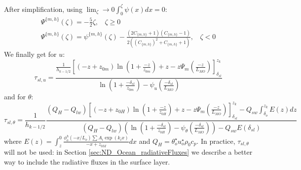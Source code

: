 After simplification, using $\lim_\zeta\to0 \int_0^\zeta\psi(x)dx = 0$:
\begin{equation}
\begin{aligned}
\Psi^{\{m,h\}}(\zeta)= -\frac{5}{2}\zeta, ~~~~ \zeta \geq 0 \\
	\Psi^{\{m,h\}}(\zeta)=
	\psi^{\{m,h\}}(\zeta)
	- \frac{(2C_{\{m,h\}}+1)(C_{\{m,h\}} - 1)}
	{2\left((C_{\{m,h\}})^2 + C_{\{m,h\}} + 1\right)}, ~~~~ \zeta < 0
\end{aligned}
\end{equation}
We finally get for $u$:
\begin{equation}
	\tau_{sl, u} = \frac{\frac{1}{{h_{k-1/2}}}
    \left[
	    (-z+z_{0m})\ln(1+\frac{-z}{z_{0m}})+z
    -
    z \Psi_m(\frac{-z}{L_{MO}}) \right]_{\delta_{sl}}^{z_k}
    }{\ln(1+\frac{-\delta_{sl}}{z_{0m}})- \psi_u(\frac{-\delta_{sl}}{L_{MO}})
    }
\end{equation}
and for $\theta$:
\begin{equation}
	\tau_{sl, \theta} =  \frac{1}{{h_{k-1/2}}}\frac{(Q_H -
		Q_{lw})
    \left[
	    (-z+z_{0H})\ln(1+\frac{-z}{z_{0H}})+z
    -
    z \Psi_m(\frac{-z}{L_{MO}}) \right]_{\delta_{sl}}^{z_k}
	- Q_{sw} \int_{\delta_o}^{z_k}
		E(z) dz
    }{(Q_H - Q_{lw})
	    \left(\ln(1+\frac{-\delta_{sl}}{z_{0H}})-
	    \psi_\theta(\frac{-\delta_{sl}}{L_{MO}})\right)
	    -Q_{sw} E(\delta_{sl})
    }
\end{equation}
where $E(z) = \int_{z}^0 \frac{\phi^h_o(-x/L_o)
		\sum A_i \exp (k_i x)
		}{-x + z_{0M}}dx$
and $Q_H = \theta_o^{\star}u_o^{\star}\rho_0 c_p$.
In practice, $\tau_{sl, \theta}$ will not be used: in Section
\ref{sec:ND_Ocean_radiativeFluxes} we describe a better way to
include the radiative fluxes in the surface layer.
